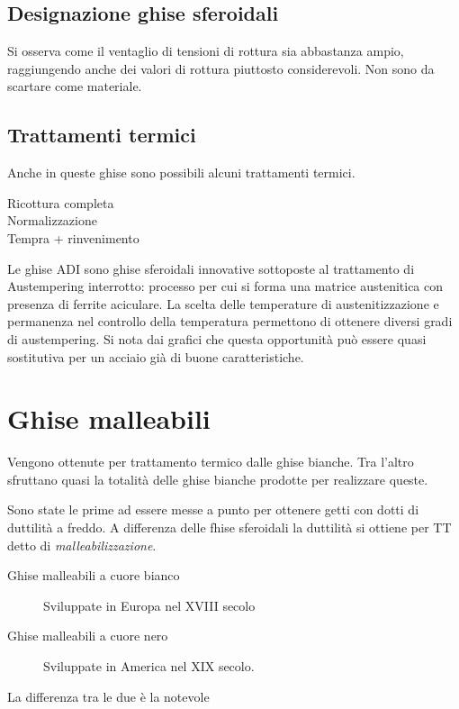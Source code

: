 \subsection{Designazione ghise sferoidali}
Si osserva come il ventaglio di tensioni di rottura sia abbastanza ampio, raggiungendo anche dei valori di rottura piuttosto considerevoli.
Non sono da scartare come materiale.

\subsection{Trattamenti termici}
Anche in queste ghise sono possibili alcuni trattamenti termici.
\begin{description}
\item[Ricottura completa]
\item[Normalizzazione]
\item[Tempra + rinvenimento]
\end{description}
Le ghise \ac{ADI} sono ghise sferoidali innovative sottoposte al trattamento di Austempering interrotto: processo per cui si forma una matrice austenitica con presenza di ferrite aciculare.
La scelta delle temperature di austenitizzazione e permanenza nel controllo della temperatura permettono di ottenere diversi gradi di austempering.
Si nota dai grafici che questa opportunità può essere quasi sostitutiva per un acciaio già di buone caratteristiche.

\section{Ghise malleabili}
Vengono ottenute per trattamento termico dalle ghise bianche.
Tra l'altro sfruttano quasi la totalità delle ghise bianche prodotte per realizzare queste.

Sono state le prime ad essere messe a punto per ottenere getti con dotti di duttilità a freddo.
A differenza delle fhise sferoidali la duttilità si ottiene per \ac{TT} detto di \emph{malleabilizzazione}.
\begin{description}
\item[Ghise malleabili a cuore bianco] Sviluppate in Europa nel XVIII secolo
\item[Ghise malleabili a cuore nero] Sviluppate in America nel XIX secolo.
\end{description}
La differenza tra le due è la notevole\todo{\\Aggiungi}

